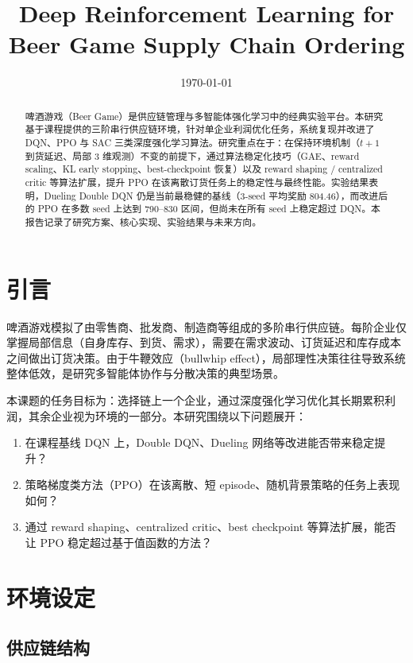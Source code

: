 \documentclass{article}
\title{Deep Reinforcement Learning for Beer Game Supply Chain Ordering}
\author{}
\date{\today}
\begin{document}
\maketitle

\begin{abstract}
  啤酒游戏（Beer Game）是供应链管理与多智能体强化学习中的经典实验平台。本研究基于课程提供的三阶串行供应链环境，针对单企业利润优化任务，系统复现并改进了 DQN、PPO 与 SAC 三类深度强化学习算法。研究重点在于：在保持环境机制（$t+1$ 到货延迟、局部 3 维观测）不变的前提下，通过算法稳定化技巧（GAE、reward scaling、KL early stopping、best-checkpoint 恢复）以及 reward shaping / centralized critic 等算法扩展，提升 PPO 在该离散订货任务上的稳定性与最终性能。实验结果表明，Dueling Double DQN 仍是当前最稳健的基线（3-seed 平均奖励 804.46），而改进后的 PPO 在多数 seed 上达到 790--830 区间，但尚未在所有 seed 上稳定超过 DQN。本报告记录了研究方案、核心实现、实验结果与未来方向。
\end{abstract}

\section{引言}

啤酒游戏模拟了由零售商、批发商、制造商等组成的多阶串行供应链。每阶企业仅掌握局部信息（自身库存、到货、需求），需要在需求波动、订货延迟和库存成本之间做出订货决策。由于牛鞭效应（bullwhip effect），局部理性决策往往导致系统整体低效，是研究多智能体协作与分散决策的典型场景。

本课题的任务目标为：选择链上一个企业，通过深度强化学习优化其长期累积利润，其余企业视为环境的一部分。本研究围绕以下问题展开：
\begin{enumerate}[label=(\arabic*)]
  \item 在课程基线 DQN 上，Double DQN、Dueling 网络等改进能否带来稳定提升？
  \item 策略梯度类方法（PPO）在该离散、短 episode、随机背景策略的任务上表现如何？
  \item 通过 reward shaping、centralized critic、best checkpoint 等算法扩展，能否让 PPO 稳定超过基于值函数的方法？
\end{enumerate}

\section{环境设定}

\subsection{供应链结构}
\end{document}
